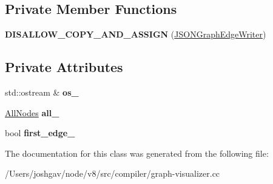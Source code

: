 \subsection*{Private Member Functions}
\begin{DoxyCompactItemize}
\item 
{\bfseries D\+I\+S\+A\+L\+L\+O\+W\+\_\+\+C\+O\+P\+Y\+\_\+\+A\+N\+D\+\_\+\+A\+S\+S\+I\+GN} (\hyperlink{classv8_1_1internal_1_1compiler_1_1_j_s_o_n_graph_edge_writer}{J\+S\+O\+N\+Graph\+Edge\+Writer})\hypertarget{classv8_1_1internal_1_1compiler_1_1_j_s_o_n_graph_edge_writer_aaea6c60a928199322b47db49741ab5dc}{}\label{classv8_1_1internal_1_1compiler_1_1_j_s_o_n_graph_edge_writer_aaea6c60a928199322b47db49741ab5dc}

\end{DoxyCompactItemize}
\subsection*{Private Attributes}
\begin{DoxyCompactItemize}
\item 
std\+::ostream \& {\bfseries os\+\_\+}\hypertarget{classv8_1_1internal_1_1compiler_1_1_j_s_o_n_graph_edge_writer_afb1a2783f62c8e5efb20583c7919032f}{}\label{classv8_1_1internal_1_1compiler_1_1_j_s_o_n_graph_edge_writer_afb1a2783f62c8e5efb20583c7919032f}

\item 
\hyperlink{classv8_1_1internal_1_1compiler_1_1_all_nodes}{All\+Nodes} {\bfseries all\+\_\+}\hypertarget{classv8_1_1internal_1_1compiler_1_1_j_s_o_n_graph_edge_writer_a10dd3ef974b40537f0582a76088d1caa}{}\label{classv8_1_1internal_1_1compiler_1_1_j_s_o_n_graph_edge_writer_a10dd3ef974b40537f0582a76088d1caa}

\item 
bool {\bfseries first\+\_\+edge\+\_\+}\hypertarget{classv8_1_1internal_1_1compiler_1_1_j_s_o_n_graph_edge_writer_ac7bfe20ad274bd31f53d937f31debc6e}{}\label{classv8_1_1internal_1_1compiler_1_1_j_s_o_n_graph_edge_writer_ac7bfe20ad274bd31f53d937f31debc6e}

\end{DoxyCompactItemize}


The documentation for this class was generated from the following file\+:\begin{DoxyCompactItemize}
\item 
/\+Users/joshgav/node/v8/src/compiler/graph-\/visualizer.\+cc\end{DoxyCompactItemize}
